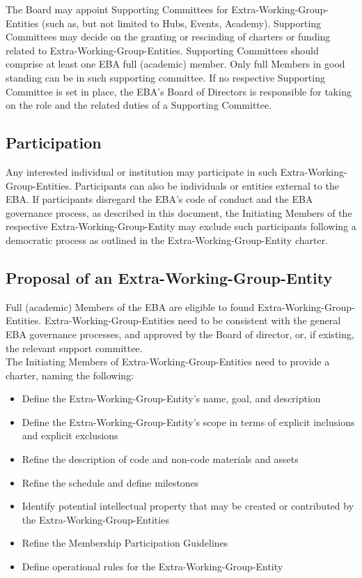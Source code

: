 \documentclass{article}
\begin{document}
The Board may appoint Supporting Committees for Extra-Working-Group-Entities (such as, but not limited to Hubs, Events, Academy). 
Supporting Committees may decide on the granting or rescinding of  charters or funding related to Extra-Working-Group-Entities. 
Supporting Committees should comprise at least one EBA full (academic) member. 
Only full Members in good standing can be in such supporting committee. 
If no respective Supporting Committee is set in place, the EBA's  Board of Directors is responsible for taking on the role and the related duties of a Supporting Committee.

\subsection{Participation}

Any interested individual or institution may participate in such Extra-Working-Group-Entities. 
Participants can also be individuals or entities external to the EBA. If participants disregard the EBA's code of conduct and the EBA governance process, as described in this document, the Initiating Members of the respective Extra-Working-Group-Entity may exclude such participants following a democratic process as outlined in the Extra-Working-Group-Entity charter.

\subsection{Proposal of an Extra-Working-Group-Entity}

Full (academic) Members of the EBA are eligible to found Extra-Working-Group-Entities. 
Extra-Working-Group-Entities need to be consistent with the general EBA governance processes, and approved by the Board of director, or, if existing, the relevant support committee. \\
The Initiating Members of Extra-Working-Group-Entities need to provide a charter, naming  the following: \\

\begin{itemize}
	\item Define the Extra-Working-Group-Entity's name, goal, and description
	\item Define the Extra-Working-Group-Entity's scope in terms of explicit inclusions and explicit exclusions
	\item Refine the description of code and non-code materials and assets
	\item Refine the schedule and define milestones
	\item Identify potential intellectual property that may be created or contributed by the Extra-Working-Group-Entities
	\item Refine the Membership Participation Guidelines
	\item Define operational rules for the Extra-Working-Group-Entity
\end{itemize}
\end{document}
